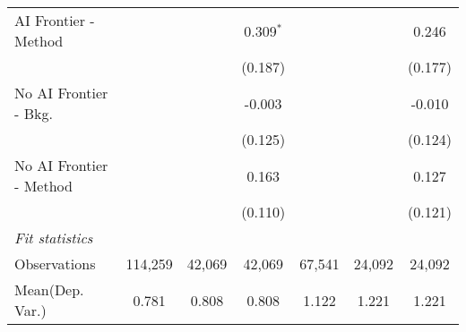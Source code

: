 \begin{tabular}{lcccccc}
   AI Frontier - Method    &               &               & 0.309$^{*}$   &               &               & 0.246\\   
                           &               &               & (0.187)       &               &               & (0.177)\\   
   No AI Frontier - Bkg.   &               &               & -0.003        &               &               & -0.010\\   
                           &               &               & (0.125)       &               &               & (0.124)\\   
   No AI Frontier - Method &               &               & 0.163         &               &               & 0.127\\   
                           &               &               & (0.110)       &               &               & (0.121)\\   
   \midrule
   \emph{Fit statistics}\\
   Observations            & 114,259       & 42,069        & 42,069        & 67,541        & 24,092        & 24,092\\  
Mean(Dep. Var.) & 0.781 & 0.808 & 0.808 & 1.122 & 1.221 & 1.221 \\
   

\end{tabular}
